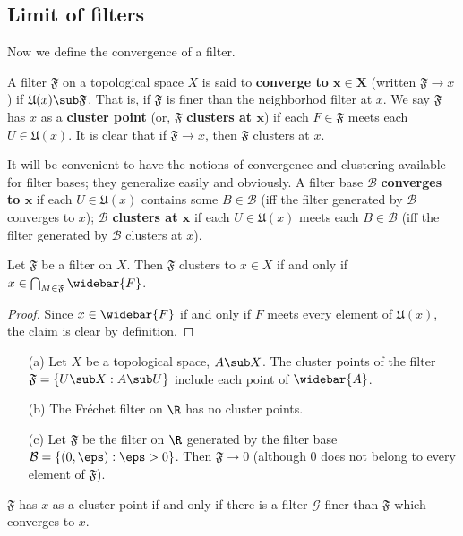 \subsection{Limit of filters}
Now we define the convergence of a filter.
\begin{definition}
A filter $\mathfrak{F}$ on a topological space $X$ is said to \textbf{converge to $\bm{x\in X}$} (written $\mathfrak{F}\to x$) if $\mathfrak{U}(x)\sub\mathfrak{F}$. That is, if $\mathfrak{F}$ is finer than the neighborhod filter at $x$. We say $\mathfrak{F}$ has $x$ as a \textbf{cluster point} (or, $\mathfrak{F}$ \textbf{clusters at $\bm{x}$}) if each $F\in\mathfrak{F}$ meets each $U\in\mathfrak{U}(x)$. It is clear that if $\mathfrak{F}\to x$, then $\mathfrak{F}$ clusters at $x$.
\end{definition}
It will be convenient to have the notions of convergence and clustering available for filter bases; they generalize easily and obviously. A filter base $\mathcal{B}$ \textbf{converges to $\bm{x}$} if each $U\in\mathfrak{U}(x)$ contains some $B\in\mathcal{B}$ (iff the filter generated by $\mathcal{B}$ converges to $x$); $\mathcal{B}$ \textbf{clusters at $\bm{x}$} if each $U\in\mathfrak{U}(x)$ meets each $B\in\mathcal{B}$ (iff the filter generated by $\mathcal{B}$ clusters at $x$).
\begin{lemma}\label{filter cluster iff}
Let $\mathfrak{F}$ be a filter on $X$. Then $\mathfrak{F}$ clusters to $x\in X$ if and only if $x\in\bigcap_{M\in\mathfrak{F}}\widebar{F}$.
\end{lemma}
\begin{proof}
Since $x\in\widebar{F}$ if and only if $F$ meets every element of $\mathfrak{U}(x)$, the claim is clear by definition.
\end{proof}
\begin{example}
\mbox{}
\begin{itemize}
\item[(a)] Let $X$ be a topological space, $A\sub X$. The cluster points of the filter $\mathfrak{F}=\{U\sub X:A\sub U\}$ include each point of $\widebar{A}$.
\item[(b)] The Fr\'echet filter on $\R$ has no cluster points.
\item[(c)] Let $\mathfrak{F}$ be the filter on $\R$ generated by the filter base $\mathcal{B}=\{(0,\eps):\eps>0\}$. Then $\mathfrak{F}\to 0$ (although $0$ does not belong to every element of $\mathfrak{F}$).
\end{itemize}
\end{example}
\begin{proposition}\label{filter cluster iff finer filter converge}
$\mathfrak{F}$ has $x$ as a cluster point if and only if there is a filter $\mathcal{G}$ finer than $\mathfrak{F}$ which converges to $x$.
\end{proposition}

